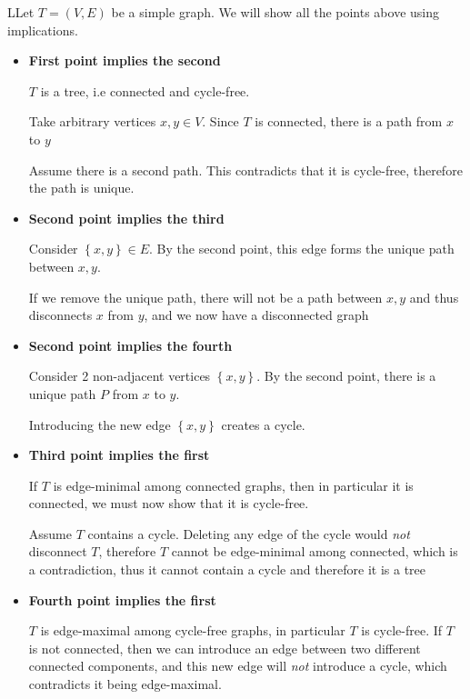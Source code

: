 \begin{prf}
  LLet $T = (V,E)$ be a simple graph. We will show all the points above using implications. 
  \par\bigskip
  \begin{itemize}
    \item\textbf{First point implies the second}\par
      $T$ is a tree, i.e connected and cycle-free.\par
      Take arbitrary vertices $x,y\in V$. Since $T$ is connected, there is a path from $x$ to $y$\par
      Assume there is a second path. This contradicts that it is cycle-free, therefore the path is unique.
      \par\bigskip
    \item\textbf{Second point implies the third}\par
    Consider $\left\{x,y\right\}\in E$. By the second point, this edge forms the unique path between $x,y$.\par
    If we remove the unique path, there will not be a path between $x,y$ and thus disconnects $x$ from $y$, and we now have a disconnected graph
    \par\bigskip
  \item\textbf{Second point implies the fourth}\par
    Consider 2 non-adjacent vertices $\left\{x,y\right\}$. By the second point, there is a unique path $P$ from $x$ to $y$.\par
    Introducing the new edge $\left\{x,y\right\}$ creates a cycle.
  \par\bigskip
  \item\textbf{Third point implies the first}\par
    If $T$ is edge-minimal among connected graphs, then in particular it is connected, we must now show that it is cycle-free.\par
    Assume $T$ contains a cycle. Deleting any edge of the cycle would \textit{not} disconnect $T$, therefore $T$ cannot be edge-minimal among connected, which is a contradiction, thus it cannot contain a cycle and therefore it is a tree
  \item\textbf{Fourth point implies the first}\par
    $T$ is edge-maximal among cycle-free graphs, in particular $T$ is cycle-free. If $T$ is not connected, then we can introduce an edge between two different connected components, and this new edge will \textit{not} introduce a cycle, which contradicts it being edge-maximal. 
  \end{itemize}
\end{prf}
